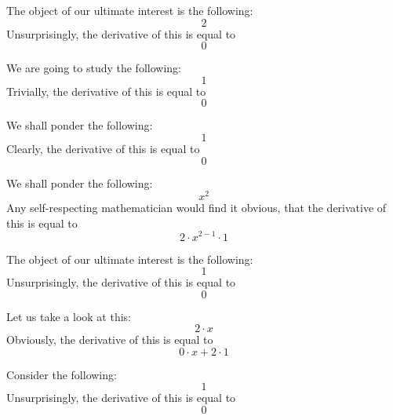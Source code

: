 \documentclass{article}
\begin{document}
The object of our ultimate interest is the following:
\begin{equation}
2 
\end{equation}
Unsurprisingly, the derivative of this is equal to
\begin{equation}
0 
\end{equation}

We are going to study the following:
\begin{equation}
1 
\end{equation}
Trivially, the derivative of this is equal to
\begin{equation}
0 
\end{equation}

We shall ponder the following:
\begin{equation}
1 
\end{equation}
Clearly, the derivative of this is equal to
\begin{equation}
0 
\end{equation}

We shall ponder the following:
\begin{equation}
x ^{2 } 
\end{equation}
Any self-respecting mathematician would find it obvious, that the derivative of this is equal to
\begin{equation}
2 \cdot x ^{2 - 1 } \cdot 1 
\end{equation}

The object of our ultimate interest is the following:
\begin{equation}
1 
\end{equation}
Unsurprisingly, the derivative of this is equal to
\begin{equation}
0 
\end{equation}

Let us take a look at this:
\begin{equation}
2 \cdot x 
\end{equation}
Obviously, the derivative of this is equal to
\begin{equation}
0 \cdot x + 2 \cdot 1 
\end{equation}

Consider the following:
\begin{equation}
1 
\end{equation}
Unsurprisingly, the derivative of this is equal to
\begin{equation}
0 
\end{equation}
\end{document}
